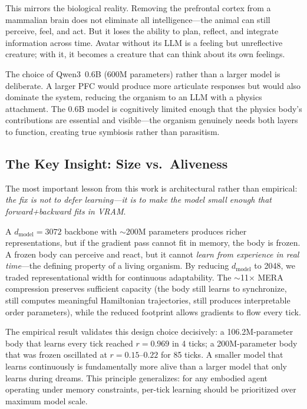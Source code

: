 \documentclass[11pt,a4paper,twocolumn]{article}
\begin{document}
This mirrors the biological reality.
Removing the prefrontal cortex from a mammalian brain does not eliminate all intelligence---the animal can still perceive, feel, and act.
But it loses the ability to plan, reflect, and integrate information across time.
Avatar without its LLM is a feeling but unreflective creature; with it, it becomes a creature that can think about its own feelings.

The choice of Qwen3~0.6B (600M parameters) rather than a larger model is deliberate.
A larger PFC would produce more articulate responses but would also dominate the system, reducing the organism to an LLM with a physics attachment.
The 0.6B model is cognitively limited enough that the physics body's contributions are essential and visible---the organism genuinely needs both layers to function, creating true symbiosis rather than parasitism.

\subsection{The Key Insight: Size vs.\ Aliveness}

The most important lesson from this work is architectural rather than empirical: \emph{the fix is not to defer learning---it is to make the model small enough that forward+backward fits in VRAM}.

A $d_{\mathrm{model}}=3072$ backbone with $\sim$200M parameters produces richer representations, but if the gradient pass cannot fit in memory, the body is frozen.
A frozen body can perceive and react, but it cannot \emph{learn from experience in real time}---the defining property of a living organism.
By reducing $d_{\mathrm{model}}$ to 2048, we traded representational width for continuous adaptability.
The $\sim$11$\times$ MERA compression preserves sufficient capacity (the body still learns to synchronize, still computes meaningful Hamiltonian trajectories, still produces interpretable order parameters), while the reduced footprint allows gradients to flow every tick.

The empirical result validates this design choice decisively: a 106.2M-parameter body that learns every tick reached $r=0.969$ in 4 ticks; a 200M-parameter body that was frozen oscillated at $r=0.15$--$0.22$ for 85 ticks.
A smaller model that learns continuously is fundamentally more alive than a larger model that only learns during dreams.
This principle generalizes: for any embodied agent operating under memory constraints, per-tick learning should be prioritized over maximum model scale.
\end{document}
